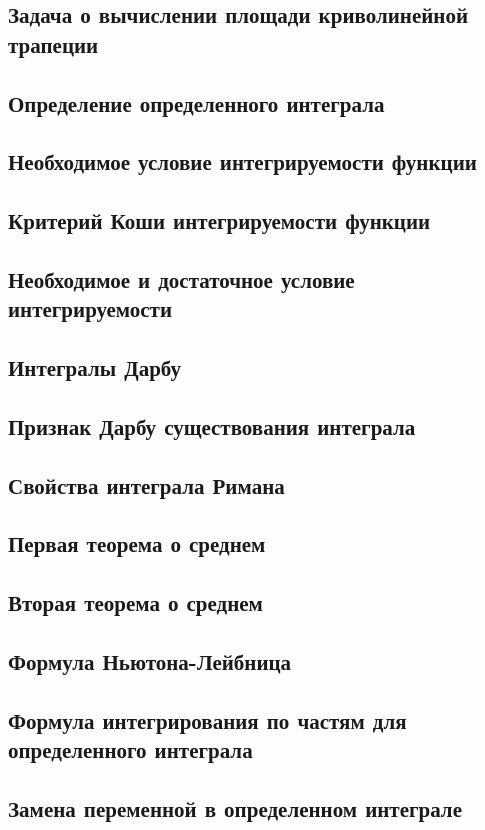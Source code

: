 \subsection{Задача о вычислении площади криволинейной трапеции}
\subsection{Определение определенного интеграла}
\subsection{Необходимое условие интегрируемости функции}
\subsection{Критерий Коши интегрируемости функции}
\subsection{Необходимое и достаточное условие интегрируемости}
\subsection{Интегралы Дарбу}
\subsection{Признак Дарбу существования интеграла}
\subsection{Свойства интеграла Римана}
\subsection{Первая теорема о среднем}
\subsection{Вторая теорема о среднем} 
\subsection{Формула Ньютона-Лейбница}
\subsection{Формула интегрирования по частям для определенного интеграла}
\subsection{Замена переменной в определенном интеграле}
